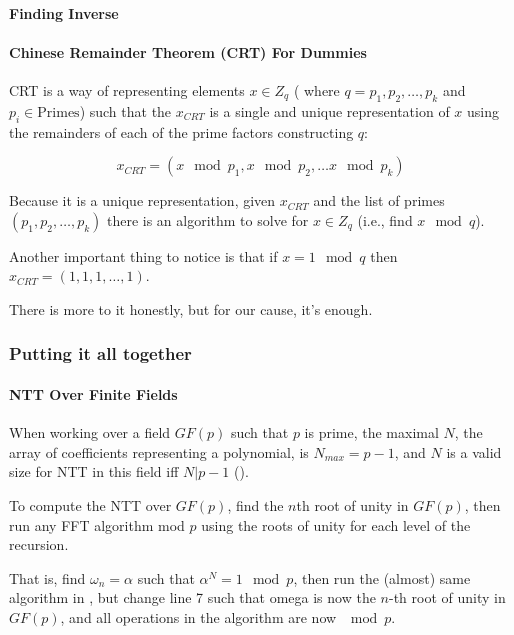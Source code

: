 \paragraph{\bf Finding Inverse}


\paragraph{\bf Chinese Remainder Theorem (CRT) For Dummies}
CRT is a way of representing elements $x\in Z_q$ (
  where $q=p_1,p_2,\dots,p_k$ and $p_i\in\text{Primes}$)
such that the $x_{CRT}$ is a single and unique representation of $x$ using the 
remainders of each of the prime factors constructing $q$:

$$ x_{CRT} = (x\mod p_1, x\mod p_2 ,\dots x\mod p_k ) $$



Because it is a unique representation, given $x_{CRT}$ and the list of
 primes $(p_1,p_2,\dots,p_k)$ there is an algorithm to solve for $x \in Z_q$
 (i.e., find $x \mod q$).


Another important thing to notice is that if  $x=1 \mod q$
 then $x_{CRT}= (1,1,1,\dots,1)$.


There is more to it honestly, but for our cause, it's enough.

\subsubsection{Putting it all together}

\paragraph[NTT Over Finite Fields]{\bf NTT Over Finite Fields} \label{ntt-field}
When working over a field $GF(p)$ such that $p$ is prime,
the maximal $N$, the array of coefficients representing a
polynomial, is $N_{max}=p-1$, and $N$ is a valid size for NTT
 in this field iff $N|p-1$ (\cite[III. number theoretic transforms]{ntt}). 


To compute the NTT over $GF(p)$, find the $n$th root of unity in $GF(p)$,
 then run any FFT algorithm mod $p$ using the roots
of unity for each level of the recursion.

That is, find $\omega_n=\alpha$ such that $\alpha^N=1 \mod p$, 
then run the (almost) same algorithm in , 
but change line 7 such that omega is now the $n$-th root of unity in $GF(p)$, and
all operations in the algorithm are now $\mod p$.

